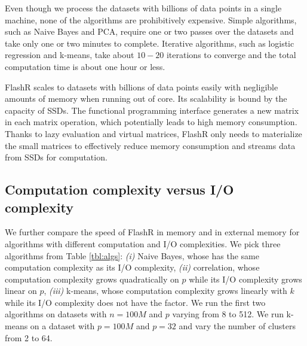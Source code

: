 Even though we process the datasets with billions of data points in a single
machine, none of the algorithms are prohibitively expensive. Simple algorithms,
such as Naive Bayes and PCA, require one or two passes over the datasets and
take only one or two minutes to complete. Iterative
algorithms, such as logistic regression and k-means, take about $10-20$
iterations to converge and the total computation time is about one hour or
less.

FlashR scales to datasets with billions of data points easily with negligible
amounts of memory when running out of core.
Its scalability is bound by the capacity of SSDs. The functional programming
interface generates a new matrix in each matrix operation, which potentially
leads to high memory consumption. Thanks to lazy evaluation and virtual matrices,
FlashR only needs to materialize the small matrices to effectively reduce
memory consumption and streams data from SSDs for computation.

\subsection{Computation complexity versus I/O complexity}
We further compare the speed of FlashR in memory and in external memory
for algorithms with different computation and I/O complexities.
We pick three algorithms from Table \ref{tbl:algs}: \textit{(i)} Naive Bayes,
whose has the same computation complexity as its I/O complexity, \textit{(ii)}
correlation, whose computation complexity grows quadratically on $p$ while
its I/O complexity grows linear on $p$, \textit{(iii)} k-means, whose computation
complexity grows linearly with $k$ while its I/O complexity does not have
the factor. We run the first two algorithms on datasets with $n=100M$ and $p$
varying from 8 to 512. We run k-means on a dataset with $p=100M$ and $p=32$
and vary the number of clusters from 2 to 64.

